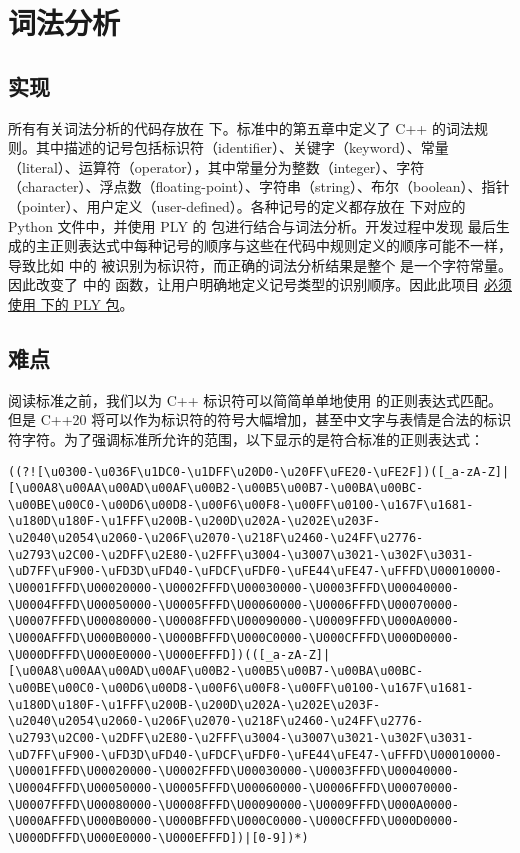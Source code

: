 \section{词法分析}

\subsection{实现}

所有有关词法分析的代码存放在  下。标准中的第五章中定义了 C++ 的词法规则。其中描述的记号包括标识符（identifier）、关键字（keyword）、常量（literal）、运算符（operator），其中常量分为整数（integer）、字符（character）、浮点数（floating-point）、字符串（string）、布尔（boolean）、指针（pointer）、用户定义（user-defined）。各种记号的定义都存放在  下对应的 Python 文件中，并使用 PLY 的  包进行结合与词法分析。开发过程中发现  最后生成的主正则表达式中每种记号的顺序与这些在代码中规则定义的顺序可能不一样，导致比如  中的  被识别为标识符，而正确的词法分析结果是整个  是一个字符常量。因此改变了  中的  函数，让用户明确地定义记号类型的识别顺序。因此此项目 \underline{必须使用  下的 PLY 包}。

\subsection{难点}

阅读标准之前，我们以为 C++ 标识符可以简简单单地使用 \code{[_a-zA-Z][_a-zA-Z0-9]*} 的正则表达式匹配。但是 C++20 将可以作为标识符的符号大幅增加，甚至中文字与表情是合法的标识符字符。为了强调标准所允许的范围，以下显示的是符合标准的正则表达式：

\begin{lstlisting}[basicstyle=\ttfamily\tiny]
((?![\u0300-\u036F\u1DC0-\u1DFF\u20D0-\u20FF\uFE20-\uFE2F])([_a-zA-Z]|[\u00A8\u00AA\u00AD\u00AF\u00B2-\u00B5\u00B7-\u00BA\u00BC-\u00BE\u00C0-\u00D6\u00D8-\u00F6\u00F8-\u00FF\u0100-\u167F\u1681-\u180D\u180F-\u1FFF\u200B-\u200D\u202A-\u202E\u203F-\u2040\u2054\u2060-\u206F\u2070-\u218F\u2460-\u24FF\u2776-\u2793\u2C00-\u2DFF\u2E80-\u2FFF\u3004-\u3007\u3021-\u302F\u3031-\uD7FF\uF900-\uFD3D\uFD40-\uFDCF\uFDF0-\uFE44\uFE47-\uFFFD\U00010000-\U0001FFFD\U00020000-\U0002FFFD\U00030000-\U0003FFFD\U00040000-\U0004FFFD\U00050000-\U0005FFFD\U00060000-\U0006FFFD\U00070000-\U0007FFFD\U00080000-\U0008FFFD\U00090000-\U0009FFFD\U000A0000-\U000AFFFD\U000B0000-\U000BFFFD\U000C0000-\U000CFFFD\U000D0000-\U000DFFFD\U000E0000-\U000EFFFD])(([_a-zA-Z]|[\u00A8\u00AA\u00AD\u00AF\u00B2-\u00B5\u00B7-\u00BA\u00BC-\u00BE\u00C0-\u00D6\u00D8-\u00F6\u00F8-\u00FF\u0100-\u167F\u1681-\u180D\u180F-\u1FFF\u200B-\u200D\u202A-\u202E\u203F-\u2040\u2054\u2060-\u206F\u2070-\u218F\u2460-\u24FF\u2776-\u2793\u2C00-\u2DFF\u2E80-\u2FFF\u3004-\u3007\u3021-\u302F\u3031-\uD7FF\uF900-\uFD3D\uFD40-\uFDCF\uFDF0-\uFE44\uFE47-\uFFFD\U00010000-\U0001FFFD\U00020000-\U0002FFFD\U00030000-\U0003FFFD\U00040000-\U0004FFFD\U00050000-\U0005FFFD\U00060000-\U0006FFFD\U00070000-\U0007FFFD\U00080000-\U0008FFFD\U00090000-\U0009FFFD\U000A0000-\U000AFFFD\U000B0000-\U000BFFFD\U000C0000-\U000CFFFD\U000D0000-\U000DFFFD\U000E0000-\U000EFFFD])|[0-9])*)
\end{lstlisting}

